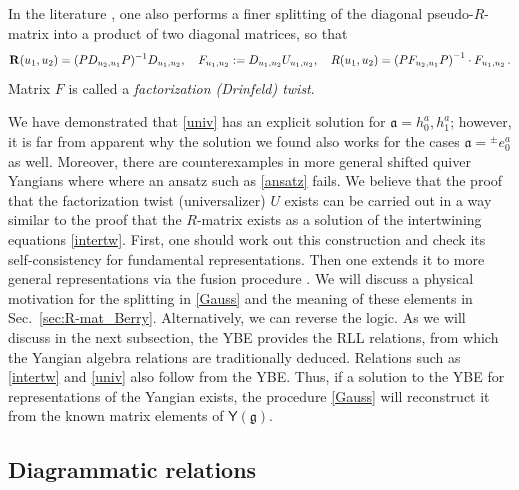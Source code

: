 \documentclass[10pt]{article}
\theoremstyle{definition}
\def\fa{\mathfrak{a}}
\def\fg{\mathfrak{g}}
\def\myY{{\mathsf{Y}}}
\numberwithin{equation}{section}
\begin{document}
In the literature \cite{drinfeld1990quasi,Pfeiffer2000Yangian,Terras2000,Pfeiffer2001QuantumAffine,Albert2000XYZ,Yang2004,Torrielli2023,Maillet2000}, one also performs a finer splitting of the diagonal pseudo-$R$-matrix into a product of two diagonal matrices, so that
\begin{equation}
	{\bf R}(u_1,u_2)=(PD_{u_2,u_1}P)^{-1}D_{u_1,u_2},\quad F_{u_1,u_2}:=D_{u_1,u_2}U_{u_1,u_2},\quad R(u_1,u_2)=\left(P F_{u_2,u_1}P\right)^{-1}\cdot F_{u_1,u_2}\,.
\end{equation}
Matrix $F$ is called a \emph{factorization (Drinfeld) twist}.

We have demonstrated that \eqref{univ} has an explicit solution for $\fa=h_0^a,h_1^a$; however, it is far from apparent why the solution we found also works for the cases $\fa={}^{\pm}e_0^a$ as well.
Moreover, there are counterexamples in more general shifted quiver Yangians \cite{Galakhov:2021xum} where where an ansatz such as \eqref{ansatz} fails.
We believe that the proof that the factorization twist (universalizer) $U$ exists can be carried out in a way similar to the proof that the $R$-matrix exists as a solution of the intertwining equations \eqref{intertw}.
First, one should work out this construction and check its self-consistency for fundamental representations.
Then one extends it to more general representations via the fusion procedure \cite{Cherednik1986,NazarovTarasov1998,KhoroshkinNazarovPapi2011,IsaevMolevOgievetsky2012,BazhanovFrassekLukowskiMeneghelliStaudacher2011}.
We will discuss a physical motivation for the splitting in \eqref{Gauss} and the meaning of these elements in Sec.~\ref{sec:R-mat_Berry}.
Alternatively, we can  reverse the logic. 
As we will discuss in the next subsection, the YBE provides the RLL relations, from which the Yangian algebra relations are traditionally deduced.
Relations such as \eqref{intertw} and \eqref{univ} also follow from the YBE.
Thus, if a solution to the YBE for representations of the Yangian exists, the procedure \eqref{Gauss} will reconstruct it from the known matrix elements of $\myY(\fg)$.


\subsection{Diagrammatic relations}\label{sec:diag}
\end{document}
